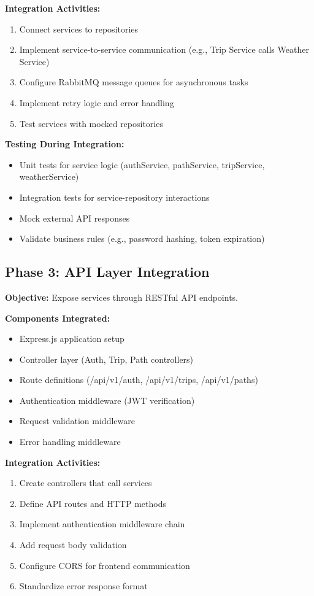 \textbf{Integration Activities:}
\begin{enumerate}
    \item Connect services to repositories
    \item Implement service-to-service communication (e.g., Trip Service calls Weather Service)
    \item Configure RabbitMQ message queues for asynchronous tasks
    \item Implement retry logic and error handling
    \item Test services with mocked repositories
\end{enumerate}

\textbf{Testing During Integration:}
\begin{itemize}
    \item Unit tests for service logic (authService, pathService, tripService, weatherService)
    \item Integration tests for service-repository interactions
    \item Mock external API responses
    \item Validate business rules (e.g., password hashing, token expiration)
\end{itemize}

\subsection{Phase 3: API Layer Integration}
\label{subsec:phase3_api_layer}

\textbf{Objective:} Expose services through RESTful API endpoints.

\textbf{Components Integrated:}
\begin{itemize}
    \item Express.js application setup
    \item Controller layer (Auth, Trip, Path controllers)
    \item Route definitions (/api/v1/auth, /api/v1/trips, /api/v1/paths)
    \item Authentication middleware (JWT verification)
    \item Request validation middleware
    \item Error handling middleware
\end{itemize}

\textbf{Integration Activities:}
\begin{enumerate}
    \item Create controllers that call services
    \item Define API routes and HTTP methods
    \item Implement authentication middleware chain
    \item Add request body validation
    \item Configure CORS for frontend communication
    \item Standardize error response format
\end{enumerate}

